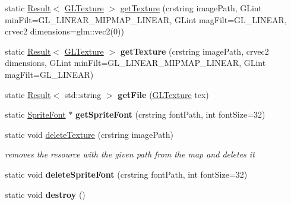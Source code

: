 \begin{DoxyCompactItemize}
\item 
static \hyperlink{classnta_1_1Result}{Result}$<$ \hyperlink{structnta_1_1GLTexture}{G\+L\+Texture} $>$ \hyperlink{classnta_1_1ResourceManager_a60911bfeef0df3802c6ef03cc10fb5c1}{get\+Texture} (crstring image\+Path, G\+Lint min\+Filt=G\+L\+\_\+\+L\+I\+N\+E\+A\+R\+\_\+\+M\+I\+P\+M\+A\+P\+\_\+\+L\+I\+N\+E\+AR, G\+Lint mag\+Filt=G\+L\+\_\+\+L\+I\+N\+E\+AR, crvec2 dimensions=glm\+::vec2(0))
\item 
\mbox{\label{classnta_1_1ResourceManager_ae14b4380aae490abd97d0bb1073d3a0b}} 
static \hyperlink{classnta_1_1Result}{Result}$<$ \hyperlink{structnta_1_1GLTexture}{G\+L\+Texture} $>$ {\bfseries get\+Texture} (crstring image\+Path, crvec2 dimensions, G\+Lint min\+Filt=G\+L\+\_\+\+L\+I\+N\+E\+A\+R\+\_\+\+M\+I\+P\+M\+A\+P\+\_\+\+L\+I\+N\+E\+AR, G\+Lint mag\+Filt=G\+L\+\_\+\+L\+I\+N\+E\+AR)
\item 
\mbox{\label{classnta_1_1ResourceManager_a5a9625aa03f75fad3d34c0ce222014e9}} 
static \hyperlink{classnta_1_1Result}{Result}$<$ std\+::string $>$ {\bfseries get\+File} (\hyperlink{structnta_1_1GLTexture}{G\+L\+Texture} tex)
\item 
\mbox{\label{classnta_1_1ResourceManager_a0411e5cf357d6d285820338d92d06a0e}} 
static \hyperlink{classnta_1_1SpriteFont}{Sprite\+Font} $\ast$ {\bfseries get\+Sprite\+Font} (crstring font\+Path, int font\+Size=32)
\item 
\mbox{\label{classnta_1_1ResourceManager_a2f9971f86fc9e50d7a62aa5f6f91a489}} 
static void \hyperlink{classnta_1_1ResourceManager_a2f9971f86fc9e50d7a62aa5f6f91a489}{delete\+Texture} (crstring image\+Path)
\begin{DoxyCompactList}\small\item\em removes the resource with the given path from the map and deletes it \end{DoxyCompactList}\item 
\mbox{\label{classnta_1_1ResourceManager_a16c549cb1496d1f38b5900258b0624c7}} 
static void {\bfseries delete\+Sprite\+Font} (crstring font\+Path, int font\+Size=32)
\item 
\mbox{\label{classnta_1_1ResourceManager_a26ff6f1cb4044d8f47fa5db9a3df2514}} 
static void {\bfseries destroy} ()
\end{DoxyCompactItemize}
